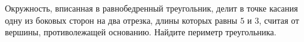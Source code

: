 \begin{ex}
	\begin{condition}
		Окружность, вписанная в равнобедренный треугольник, делит в точке касания одну из боковых сторон на два отрезка, длины которых равны \( 5  \) и \( 3 \), считая от вершины, противолежащей основанию. Найдите периметр треугольника.
	\end{condition}
\end{ex}